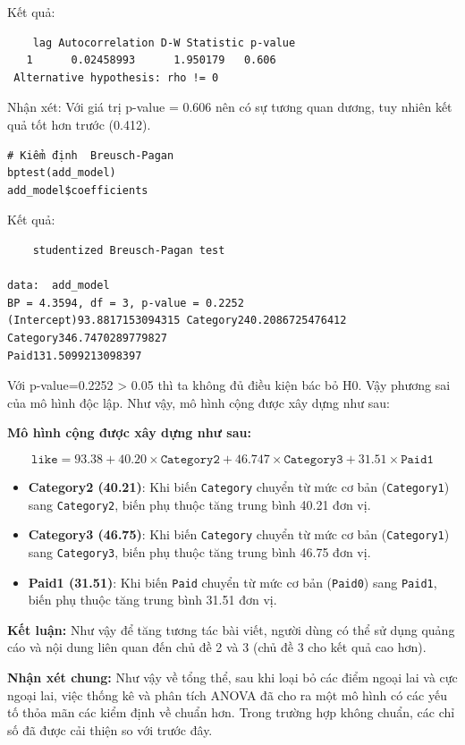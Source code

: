 \begin{itemize}
Kết quả:
\begin{lstlisting}
    lag Autocorrelation D-W Statistic p-value
   1      0.02458993      1.950179   0.606
 Alternative hypothesis: rho != 0
\end{lstlisting}


Nhận xét: Với giá trị p-value = 0.606 nên có sự tương quan dương, tuy nhiên kết quả tốt hơn trước (0.412).

\begin{lstlisting}
# Kiểm định  Breusch-Pagan
bptest(add_model)
add_model$coefficients
\end{lstlisting}
Kết quả:
\begin{lstlisting}
    studentized Breusch-Pagan test

data:  add_model
BP = 4.3594, df = 3, p-value = 0.2252
(Intercept)93.8817153094315 Category240.2086725476412   Category346.7470289779827
Paid131.5099213098397
\end{lstlisting}
 Với p-value=0.2252 > 0.05 thì ta không đủ điều kiện bác bỏ H0. Vậy phương sai của mô hình độc lập.
Như vậy, mô hình cộng được xây dựng như sau:

\textbf{Mô hình cộng được xây dựng như sau:}

\begin{equation}
\texttt{like} = 93.38 + 40.20 \times \texttt{Category2} + 46.747 \times \texttt{Category3} + 31.51 \times \texttt{Paid1}
\end{equation}

\begin{itemize}
    \item \textbf{Category2 (40.21)}: Khi biến \texttt{Category} chuyển từ mức cơ bản (\texttt{Category1}) sang \texttt{Category2}, biến phụ thuộc tăng trung bình 40.21 đơn vị.
    \item \textbf{Category3 (46.75)}: Khi biến \texttt{Category} chuyển từ mức cơ bản (\texttt{Category1}) sang \texttt{Category3}, biến phụ thuộc tăng trung bình 46.75 đơn vị.
    \item \textbf{Paid1 (31.51)}: Khi biến \texttt{Paid} chuyển từ mức cơ bản (\texttt{Paid0}) sang \texttt{Paid1}, biến phụ thuộc tăng trung bình 31.51 đơn vị.
\end{itemize}

\textbf{Kết luận:} Như vậy để tăng tương tác bài viết, người dùng có thể sử dụng quảng cáo và nội dung liên quan đến chủ đề 2 và 3 (chủ đề 3 cho kết quả cao hơn).

\textbf{Nhận xét chung:} Như vậy về tổng thể, sau khi loại bỏ các điểm ngoại lai và cực ngoại lai, việc thống kê và phân tích ANOVA đã cho ra một mô hình có các yếu tố thỏa mãn các kiểm định về chuẩn hơn. Trong trường hợp không chuẩn, các chỉ số đã được cải thiện so với trước đây.

\end{itemize}

